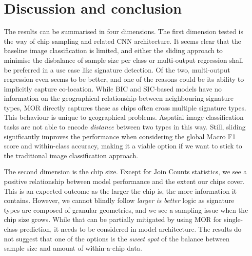\section{Discussion and conclusion} %
\label{sec:discussion}

The results can be summarised in four dimensions.
The first dimension tested is the way of chip sampling and related CNN architecture.
It seems clear that the baseline image classification is limited, and either the
sliding approach to minimise the disbalance of sample size per class or multi-output
regression shall be preferred in a use case like signature detection. Of the two,
multi-output regression even seems to be better, and one of the reasons could be its
ability to implicitly capture co-location. While BIC and SIC-based models have no
information on
the geographical relationship between neighbouring signature types, MOR directly
captures these as chips often cross multiple signature types. This behaviour is unique
to geographical problems. Aspatial image classification tasks are not able to encode
\textit{distance} between two types in this way. Still, sliding significantly improves the
performance when considering the global Macro F1 score and within-class accuracy, making
it a viable option if we want to stick to the traditional image classification approach.

The second dimension is the chip size. Except for Join Counts statistics, we see a positive
relationship between model performance and the extent our chips cover. This is an expected
outcome as the larger the chip is, the more information it contains. However, we cannot
blindly follow \textit{larger is better} logic as signature types are composed of
granular geometries, and we see a sampling issue when the chip size grows. While that
can be partially mitigated by using MOR for single-class prediction, it needs to be considered in model
architecture. The results do not suggest that one of the options is the \textit{sweet spot}
of the balance between sample size and amount of within-a-chip data.


